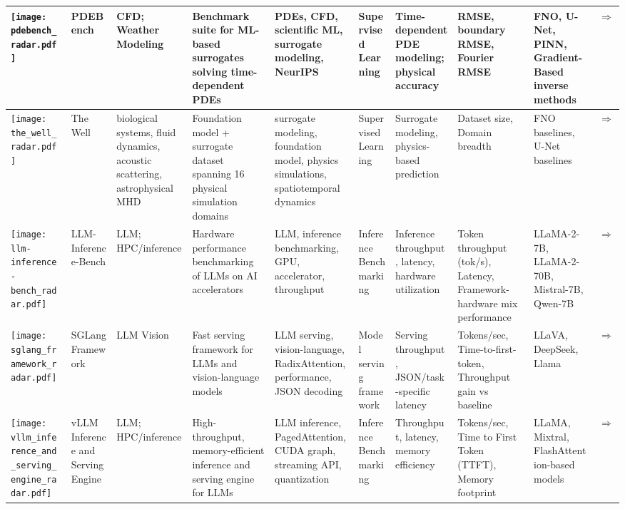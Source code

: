 \begin{landscape}
{\begin{longtable}{|p{}|p{}|p{}|p{}|p{}|p{}|p{}|p{}|p{}|p{}|}
\texttt{[image: pdebench\_radar.pdf]} & PDEBench & CFD; Weather Modeling & Benchmark suite for ML-based surrogates solving time-dependent PDEs & PDEs, CFD, scientific ML, surrogate modeling, NeurIPS & Supervised Learning & Time-dependent PDE modeling; physical accuracy & RMSE, boundary RMSE, Fourier RMSE & FNO, U-Net, PINN, Gradient-Based inverse methods & \cite{takamoto2024pdebenchextensivebenchmarkscientific}\href{https://github.com/pdebench/PDEBench}{$\Rightarrow$} \\ \hline
\texttt{[image: the\_well\_radar.pdf]} & The Well & biological systems, fluid dynamics, acoustic scattering, astrophysical MHD & Foundation model + surrogate dataset spanning 16 physical simulation domains & surrogate modeling, foundation model, physics simulations, spatiotemporal dynamics & Supervised Learning & Surrogate modeling, physics-based prediction & Dataset size, Domain breadth & FNO baselines, U-Net baselines & \cite{neurips2024_4f9a5acd}\href{https://polymathic-ai.org/the\_well/}{$\Rightarrow$} \\ \hline
\texttt{[image: llm-inference-bench\_radar.pdf]} & LLM-Inference-Bench & LLM; HPC/inference & Hardware performance benchmarking of LLMs on AI accelerators & LLM, inference benchmarking, GPU, accelerator, throughput & Inference Benchmarking & Inference throughput, latency, hardware utilization & Token throughput (tok/s), Latency, Framework-hardware mix performance & LLaMA-2-7B, LLaMA-2-70B, Mistral-7B, Qwen-7B & \cite{10820566}\href{https://github.com/argonne-lcf/LLM-Inference-Bench}{$\Rightarrow$} \\ \hline
\texttt{[image: sglang\_framework\_radar.pdf]} & SGLang Framework & LLM Vision & Fast serving framework for LLMs and vision-language models & LLM serving, vision-language, RadixAttention, performance, JSON decoding & Model serving framework & Serving throughput, JSON/task-specific latency & Tokens/sec, Time-to-first-token, Throughput gain vs baseline & LLaVA, DeepSeek, Llama & \cite{zheng2024sglangefficientexecutionstructured}\href{https://github.com/sgl-project/sglang/tree/main/benchmark}{$\Rightarrow$} \\ \hline
\texttt{[image: vllm\_inference\_and\_serving\_engine\_radar.pdf]} & vLLM Inference and Serving Engine & LLM; HPC/inference & High-throughput, memory-efficient inference and serving engine for LLMs & LLM inference, PagedAttention, CUDA graph, streaming API, quantization & Inference Benchmarking & Throughput, latency, memory efficiency & Tokens/sec, Time to First Token (TTFT), Memory footprint & LLaMA, Mixtral, FlashAttention-based models & \cite{10.1145/3600006.3613165}\href{https://github.com/vllm-project/vllm/tree/main/benchmarks}{$\Rightarrow$} \\ \hline

\end{longtable}}
\end{landscape}
